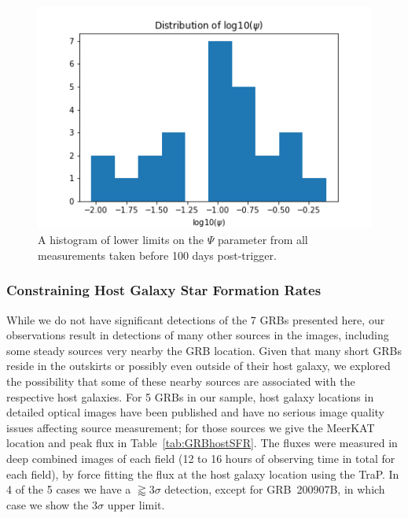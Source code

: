\documentclass[12pt]{article}
\begin{document}
\begin{figure}
	\includegraphics[width=\columnwidth]{psiobshist.png}
	\caption{A histogram of lower limits on the $\Psi$ parameter from all measurements taken before 100 days post-trigger.}
	\label{fig:psiobshist}
\end{figure}



\subsubsection{Constraining Host Galaxy Star Formation Rates}
While we do not have significant detections of the 7 GRBs presented here, our observations result in detections of many other sources in the images, including some steady sources very nearby the GRB location. Given that many short GRBs reside in the outskirts or possibly even outside of their host galaxy, we explored the possibility that some of these nearby sources are associated with the respective host galaxies. For 5 GRBs in our sample, host galaxy locations in detailed optical images have been published and have no serious image quality issues affecting source measurement; for those sources we give the MeerKAT location and peak flux in Table~\ref{tab:GRBhostSFR}. The fluxes were measured in deep combined images of each field (12 to 16 hours of observing time in total for each field), by force fitting the flux at the host galaxy location using the TraP. In 4 of the 5 cases we have a $\gtrapprox3\sigma$ detection, except for GRB~200907B, in which case we show the $3\sigma$ upper limit.
\end{document}

